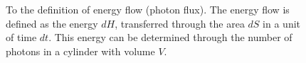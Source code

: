 \begin{figure}
\centering



\caption{To the definition of energy flow (photon flux). The energy flow
  is defined as the energy $dH$, transferred through the area $dS$ in
  a unit of time $dt$. This energy can be determined through the number
  of photons in a cylinder with volume $V$.}
\label{figPart1Ch2_add1}
\end{figure}